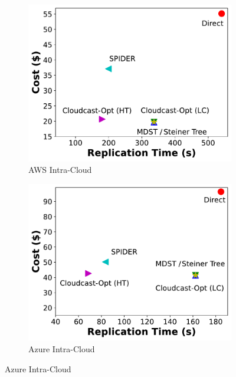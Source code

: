 \begin{figure}[tbp]
     \centering
     \begin{subfigure}[b]{0.33\textwidth}
        \centering
        \includegraphics[width=\textwidth]{figures/aws.pdf}
        \caption{AWS Intra-Cloud}
        \label{fig:aws-intra-cloud}
    \end{subfigure}
    \hfill
    \begin{subfigure}[b]{0.33\textwidth}
        \centering
        \includegraphics[width=\textwidth]{figures/azure.pdf}
        \caption{Azure Intra-Cloud}
        \label{fig:azure-intra-cloud}
    \end{subfigure}
    \hfill

\end{figure}
